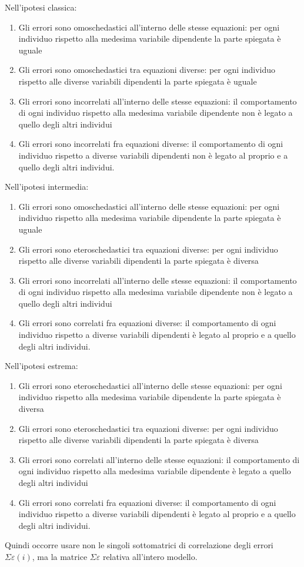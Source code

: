 \documentclass[a4page, 11pt]{article} %
\begin{document}
Nell’ipotesi classica:

\begin{enumerate}[noitemsep]
\item Gli errori sono omoschedastici all’interno delle stesse equazioni: per ogni individuo rispetto alla medesima variabile dipendente la parte spiegata è uguale
\item Gli errori sono omoschedastici tra equazioni diverse: per ogni individuo rispetto alle diverse variabili dipendenti la parte spiegata è uguale
\item Gli errori sono incorrelati all’interno delle stesse equazioni: il comportamento di ogni individuo rispetto alla medesima variabile dipendente non è legato a quello degli altri individui
\item Gli errori sono incorrelati fra equazioni diverse: il comportamento di ogni individuo rispetto a diverse variabili dipendenti non è legato al proprio e a quello degli altri individui.
\end{enumerate}

Nell’ipotesi intermedia:
\begin{enumerate}

\item Gli errori sono omoschedastici all’interno delle stesse equazioni: per ogni individuo rispetto alla medesima variabile dipendente la parte spiegata è uguale
\item Gli errori sono eteroschedastici tra equazioni diverse: per ogni individuo rispetto alle diverse variabili dipendenti la parte spiegata è diversa
\item Gli errori sono incorrelati all’interno delle stesse equazioni: il comportamento di ogni individuo rispetto alla medesima variabile dipendente non è legato a quello degli altri individui
\item Gli errori sono correlati fra equazioni diverse: il comportamento di ogni individuo rispetto a diverse variabili dipendenti è legato al proprio e a quello degli altri individui.
\end{enumerate}
Nell’ipotesi estrema:
\begin{enumerate}

\item Gli errori sono eteroschedastici all’interno delle stesse equazioni: per ogni individuo rispetto alla medesima variabile dipendente la parte spiegata è diversa
\item Gli errori sono eteroschedastici tra equazioni diverse: per ogni individuo rispetto alle diverse variabili dipendenti la parte spiegata è diversa
\item Gli errori sono correlati all’interno delle stesse equazioni: il comportamento di ogni individuo rispetto alla medesima variabile dipendente è legato a quello degli altri individui
\item Gli errori sono correlati fra equazioni diverse: il comportamento di ogni individuo rispetto a diverse variabili dipendenti è legato al proprio e a quello degli altri individui.
\end{enumerate}
Quindi occorre usare non le singoli sottomatrici di correlazione degli errori $\Sigma\varepsilon(i)$, ma la matrice $\Sigma\varepsilon$ relativa all’intero modello.
\end{document}

